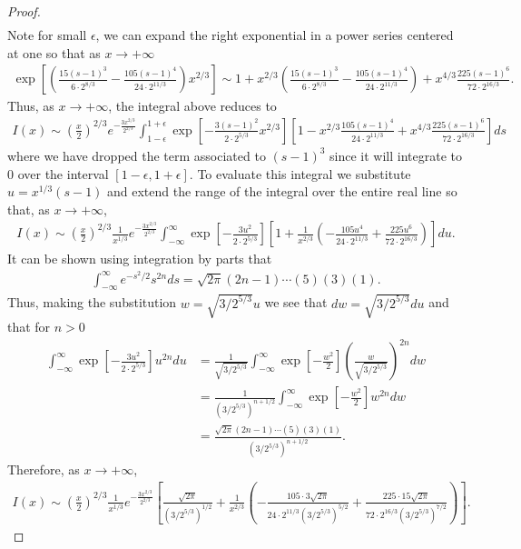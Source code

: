 \documentclass[12pt]{article}
\theoremstyle{definition}
\begin{document}
\begin{proof}
\begin{align*}
  \end{align*}
  Note for small $\epsilon$, we can expand the right exponential in a power series centered at one so that as $x \to +\infty$
  \begin{align*}
    \exp\left[ \left(\frac{15(s-1)^3}{6\cdot2^{8/3}} - \frac{105(s-1)^4}{24\cdot2^{11/3}} \right)x^{2/3}\right] \sim 1 + x^{2/3}\left(\frac{15(s-1)^3}{6\cdot2^{8/3}} - \frac{105(s-1)^4}{24\cdot2^{11/3}} \right) + x^{4/3}\frac{225(s-1)^6}{72\cdot 2^{16/3}}.
  \end{align*}
  Thus, as $x \to +\infty$, the integral above reduces to
  \begin{align*}
    I(x) \sim \left(\frac{x}{2}\right)^{2/3}e^{-\frac{3x^{2/3}}{2^{2/3}}}\int_{1-\epsilon}^{1+\epsilon} \exp\left[ -\frac{3(s-1)^2}{2\cdot2^{5/3}}x^{2/3}\right]\left[1 - x^{2/3}\frac{105(s-1)^4}{24\cdot2^{11/3}} + x^{4/3}\frac{225(s-1)^6}{72\cdot 2^{16/3}}\right]ds
  \end{align*}
  where we have dropped the term associated to $(s-1)^3$ since it will integrate to 0 over the interval $[1-\epsilon, 1+\epsilon]$. To evaluate
  this integral we substitute $u = x^{1/3}(s-1)$ and extend the range of the integral over the entire real line so that, as $x \to +\infty$,
  \begin{align*}
    I(x) \sim \left(\frac{x}{2}\right)^{2/3} \frac{1}{x^{1/3}}e^{-\frac{3x^{2/3}}{2^{2/3}}} \int_{-\infty}^{\infty} \exp\left[ -\frac{3u^2}{2\cdot2^{5/3}}\right]\left[1 + \frac{1}{x^{2/3}}\left(- \frac{105 u^4}{24\cdot2^{11/3}} + \frac{225u^6}{72\cdot 2^{16/3}}\right)\right]du.
  \end{align*}
  It can be shown using integration by parts that
  \begin{align*}
    \int_{-\infty}^\infty e^{-s^2/2}s^{2n}ds = \sqrt{2\pi}(2n-1)\cdots(5)(3)(1).
  \end{align*}
  Thus, making the substitution $w=\sqrt{3/2^{5/3}}u$ we see that $dw = \sqrt{3/2^{5/3}}du$ and that for $n>0$
  \begin{align*}
    \int_{-\infty}^\infty \exp\left[ -\frac{3u^2}{2\cdot2^{5/3}}\right]u^{2n}du
    &= \frac{1}{\sqrt{3/2^{5/3}}}\int_{-\infty}^\infty \exp\left[-\frac{w^2}{2}\right]\left(\frac{w}{\sqrt{3/2^{5/3}}}\right)^{2n}dw \\
    &= \frac{1}{(3/2^{5/3})^{n+1/2}}\int_{-\infty}^\infty \exp\left[-\frac{w^2}{2}\right]w^{2n}dw \\
    &= \frac{\sqrt{2\pi}(2n-1)\cdots(5)(3)(1)}{{(3/2^{5/3})^{n+1/2}}}.
  \end{align*}
  Therefore, as $x\to+\infty$,
  \begin{align*}
    I(x) \sim \left(\frac{x}{2}\right)^{2/3} \frac{1}{x^{1/3}}e^{-\frac{3x^{2/3}}{2^{2/3}}} \left[\frac{\sqrt{2\pi}}{{(3/2^{5/3})^{1/2}}} + \frac{1}{x^{2/3}}\left(- \frac{105\cdot3\sqrt{2\pi}}{24\cdot2^{11/3}(3/2^{5/3})^{5/2}} + \frac{225\cdot15\sqrt{2\pi}}{72\cdot 2^{16/3}(3/2^{5/3})^{7/2}}\right)\right].
  \end{align*}

\end{proof}
\newpage
\end{document}
